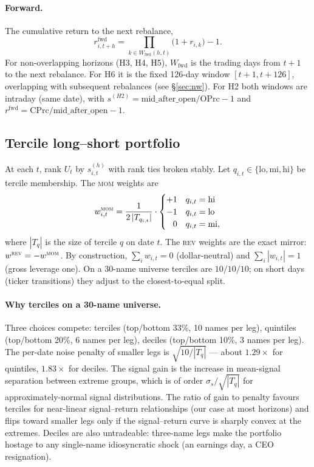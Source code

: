 \documentclass[10pt,conference,compsoc]{IEEEtran}
\newcommand{\MOM}{\textsc{mom}}  \newcommand{\REV}{\textsc{rev}}
\begin{document}
\paragraph{Forward.} The cumulative return to the next rebalance,
\begin{equation}
  r_{i,t+h}^{\text{fwd}} =
  \prod_{k \in W_{\text{fwd}}(h,t)}\bigl(1 + r_{i,k}\bigr) - 1.
  \label{eq:fwd}
\end{equation}
For non-overlapping horizons (H3, H4, H5), $W_{\text{fwd}}$ is the
trading days from $t{+}1$ to the next rebalance. For H6 it is the
fixed 126-day window $[t{+}1, t{+}126]$, overlapping with subsequent
rebalances (see \S\ref{sec:nw}). For H2 both windows are intraday
(same date), with $s^{(H2)} = \text{mid\_after\_open}/\text{OPrc} - 1$
and $r^{\text{fwd}} = \text{CPrc}/\text{mid\_after\_open} - 1$.

\subsection{Tercile long--short portfolio}

At each $t$, rank $U_t$ by $s^{(h)}_{i,t}$ with rank ties broken
stably. Let $q_{i,t} \in \{\text{lo},\text{mi},\text{hi}\}$ be tercile
membership. The \MOM{} weights are
\begin{equation}
  w^{\MOM}_{i,t} = \frac{1}{2\,|T_{q_{i,t}}|}\cdot
  \begin{cases}
    +1 & q_{i,t} = \text{hi}\\
    -1 & q_{i,t} = \text{lo}\\
    \phantom{-}0 & q_{i,t} = \text{mi},
  \end{cases}
  \label{eq:weights}
\end{equation}
where $|T_{q}|$ is the size of tercile $q$ on date $t$. The \REV{}
weights are the exact mirror: $w^{\REV} = -w^{\MOM}$. By construction,
$\sum_i w_{i,t} = 0$ (dollar-neutral) and $\sum_i |w_{i,t}| = 1$
(gross leverage one). On a 30-name universe terciles are $10/10/10$;
on short days (ticker transitions) they adjust to the
closest-to-equal split.

\paragraph{Why terciles on a 30-name universe.} Three choices
compete: terciles (top/bottom 33\%, 10 names per leg), quintiles
(top/bottom 20\%, 6 names per leg), deciles (top/bottom 10\%, 3
names per leg). The per-date noise penalty of smaller legs is
$\sqrt{10/|T_q|}$ --- about $1.29\times$ for quintiles,
$1.83\times$ for deciles. The signal gain is the increase in
mean-signal separation between extreme groups, which is of order
$\sigma_s / \sqrt{|T_q|}$ for approximately-normal signal
distributions. The ratio of gain to penalty favours terciles for
near-linear signal--return relationships (our case at most
horizons) and flips toward smaller legs only if the signal--return
curve is sharply convex at the extremes. Deciles are also
untradeable: three-name legs make the portfolio hostage to any
single-name idiosyncratic shock (an earnings day, a CEO
resignation).
\end{document}
